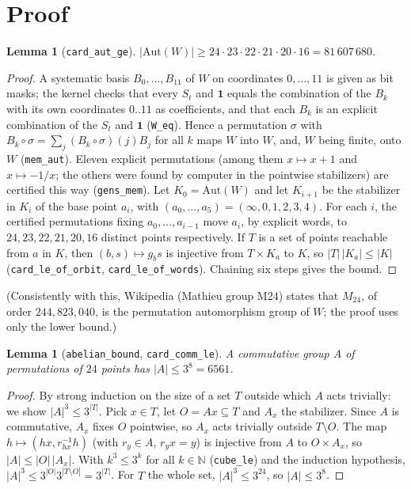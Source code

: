\documentclass[11pt]{article}
\newtheorem{lemma}[theorem]{Lemma}
\begin{document}
\section*{Proof}
\begin{lemma}[\texttt{card\_aut\_ge}]
$|\mathrm{Aut}(W)| \ge 24\cdot 23\cdot 22\cdot 21\cdot 20\cdot 16 = 81\,607\,680$.
\end{lemma}
\begin{proof}
A systematic basis $B_0,\dots,B_{11}$ of $W$ on coordinates $0,\dots,11$ is given as bit masks; the kernel checks
that every $S_t$ and $\mathbf 1$ equals the combination of the $B_k$ with its own coordinates $0..11$ as
coefficients, and that each $B_k$ is an explicit combination of the $S_t$ and $\mathbf 1$ (\texttt{W\_eq}). Hence a
permutation $\sigma$ with $B_k\circ\sigma = \sum_j (B_k\circ\sigma)(j)B_j$ for all $k$ maps $W$ into $W$, and, $W$ being
finite, onto $W$ (\texttt{mem\_aut}). Eleven explicit permutations (among them $x\mapsto x+1$ and
$x\mapsto -1/x$; the others were found by computer in the pointwise stabilizers) are certified this way
(\texttt{gens\_mem}). Let $K_0 = \mathrm{Aut}(W)$ and let $K_{i+1}$ be the stabilizer in $K_i$ of the base point
$a_i$, with $(a_0,\dots,a_5) = (\infty,0,1,2,3,4)$. For each $i$, the certified permutations fixing $a_0,\dots,a_{i-1}$
move $a_i$, by explicit words, to $24, 23, 22, 21, 20, 16$ distinct points respectively. If $T$ is a set of points
reachable from $a$ in $K$, then $(b,s)\mapsto g_b s$ is injective from $T\times K_a$ to $K$, so $|T|\,|K_a|\le |K|$
(\texttt{card\_le\_of\_orbit}, \texttt{card\_le\_of\_words}). Chaining six steps gives the bound.
\end{proof}
(Consistently with this, Wikipedia (Mathieu group M24) states that $M_{24}$, of order $244{,}823{,}040$, is the
permutation automorphism group of $W$; the proof uses only the lower bound.)

\begin{lemma}[\texttt{abelian\_bound}, \texttt{card\_comm\_le}]
A commutative group $A$ of permutations of $24$ points has $|A|\le 3^8 = 6561$.
\end{lemma}
\begin{proof}
By strong induction on the size of a set $T$ outside which $A$ acts trivially: we show $|A|^3\le 3^{|T|}$. Pick
$x\in T$, let $O = Ax\subseteq T$ and $A_x$ the stabilizer. Since $A$ is commutative, $A_x$ fixes $O$ pointwise, so
$A_x$ acts trivially outside $T\setminus O$. The map $h\mapsto (hx, r_{hx}^{-1}h)$ (with $r_y\in A$, $r_y x = y$) is
injective from $A$ to $O\times A_x$, so $|A|\le |O|\,|A_x|$. With $k^3\le 3^k$ for all $k\in\mathbb N$
(\texttt{cube\_le}) and the induction hypothesis, $|A|^3 \le 3^{|O|}3^{|T\setminus O|} = 3^{|T|}$. For $T$ the whole
set, $|A|^3\le 3^{24}$, so $|A|\le 3^8$.
\end{proof}
\end{document}
